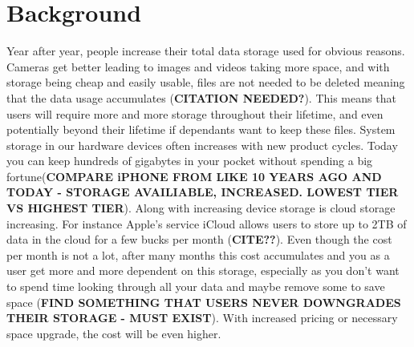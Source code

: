 \section{Background}
\label{sec:background}


Year after year, people increase their total data storage used for obvious reasons. Cameras get better leading to images and videos taking more space, and with storage being cheap and easily usable, files are not needed to be deleted meaning that the data usage accumulates (\textbf{CITATION NEEDED?}). This means that users will require more and more storage throughout their lifetime, and even potentially beyond their lifetime if dependants want to keep these files. System storage in our hardware devices often increases with new product cycles. Today you can keep hundreds of gigabytes in your pocket without spending a big fortune(\textbf{COMPARE iPHONE FROM LIKE 10 YEARS AGO AND TODAY - STORAGE AVAILIABLE, INCREASED. LOWEST TIER VS HIGHEST TIER}). Along with increasing device storage is cloud storage increasing. For instance Apple's service iCloud allows users to store up to 2TB of data in the cloud for a few bucks per month (\textbf{CITE??}). Even though the cost per month is not a lot, after many months this cost accumulates and you as a user get more and more dependent on this storage, especially as you don't want to spend time looking through all your data and maybe remove some to save space (\textbf{FIND SOMETHING THAT USERS NEVER DOWNGRADES THEIR STORAGE - MUST EXIST}). With increased pricing or necessary space upgrade, the cost will be even higher.

